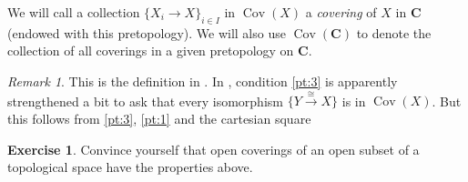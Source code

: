 \documentclass[12pt,a4paper]{amsart}
\theoremstyle{plain}
\theoremstyle{definition}
\newtheorem{xca}[thm]{Exercise}
\theoremstyle{remark}
\newtheorem{rem}[thm]{Remark}
\begin{document}
We will call a collection $\{ X_{i} \to X \}_{i \in I}$ in $\operatorname{Cov}(X)$ a \textit{covering} of $X$ in $\mathbf{C}$ (endowed with this pretopology).
We will also use $\operatorname{Cov}(\mathbf{C})$ to denote the collection of all coverings in a given pretopology on $\mathbf{C}$.

\begin{rem}
  This is the definition in \cite{sga4}.
  In \cite{stacks-project}, condition \ref{pt:3} is apparently strengthened a bit to ask that every isomorphism $\{ Y \xrightarrow{\cong} X \}$ is in $\operatorname{Cov}(X)$.
  But this follows from \ref{pt:3}, \ref{pt:1} and the cartesian square
  \begin{center}
  \end{center}
\end{rem}

\begin{xca}
  Convince yourself that open coverings of an open subset of a topological space have the properties above.
\end{xca}
\end{document}
